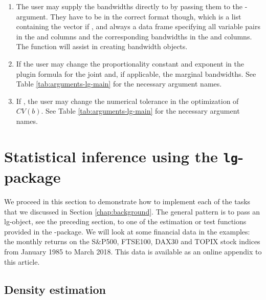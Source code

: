 \begin{enumerate}
\def\labelenumi{\arabic{enumi}.}
\item
  The user may supply the bandwidths directly to  by passing them to the -argument. They have to be in the   correct format though, which is a list containing the vector  if , and always a data frame  specifying all variable pairs in the  and  columns and the corresponding bandwidths
  in the  and  columns. The function  will assist in creating bandwidth objects.
\item
  If  the user may change the proportionality constant and exponent in the plugin formula for the joint and, if applicable, the marginal bandwidths. See Table \ref{tab:arguments-lg-main} for the necessary argument names.
\item
  If , the user may change the numerical tolerance in the optimization of \(CV(b)\). See Table \ref{tab:arguments-lg-main} for the necessary argument names.
\end{enumerate}

\section{Statistical inference using the \texttt{lg}-package}
\label{chap:inference}

We proceed in this section to demonstrate how to implement each of the tasks that we discussed in Section \ref{chap:background}. The general pattern is to pass an lg-object, see the preceding section, to one of the estimation or test functions provided in the -package. We will look at some financial data in the examples: the monthly returns on the S\&P500, FTSE100, DAX30 and TOPIX stock indices from January 1985 to March 2018. This data is available as an online appendix to this article.

\subsection{Density estimation}\label{chap:density}

